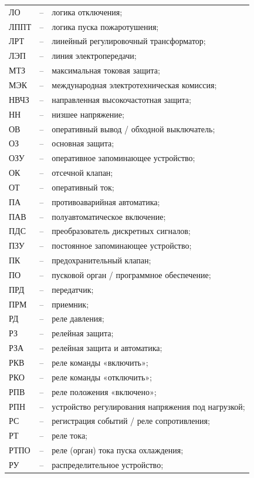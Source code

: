 \begin{longtable}{>{\raggedright\arraybackslash}m{2cm}>{\raggedright\arraybackslash}m{0.5cm}>{\raggedright\arraybackslash}m{20cm}}
ЛО & -- & логика отключения; \\
ЛППТ & -- & логика пуска пожаротушения; \\
ЛРТ & -- & линейный регулировочный трансформатор; \\
ЛЭП & -- & линия электропередачи; \\
МТЗ & -- & максимальная токовая защита; \\
МЭК & -- & международная электротехническая комиссия; \\
НВЧЗ & -- & направленная высокочастотная защита; \\
НН & -- & низшее напряжение; \\
ОВ & -- & оперативный вывод / обходной выключатель; \\
ОЗ & -- & основная защита; \\
ОЗУ & -- & оперативное запоминающее устройство; \\
ОК & -- & отсечной клапан; \\
ОТ & -- & оперативный ток; \\
ПА & -- & противоаварийная автоматика; \\
ПАВ & -- & полуавтоматическое включение; \\
ПДС & -- & преобразователь дискретных сигналов; \\
ПЗУ & -- & постоянное запоминающее устройство; \\
ПК & -- & предохранительный клапан; \\
ПО & -- & пусковой орган / программное обеспечение; \\
ПРД & -- & передатчик; \\
ПРМ & -- & приемник; \\
РД & -- & реле давления; \\
РЗ & -- & релейная защита; \\
РЗА & -- & релейная защита и автоматика; \\
РКВ & -- & реле команды «включить»; \\
РКО & -- & реле команды «отключить»; \\
РПВ & -- & реле положения «включено»; \\
РПН & -- & устройство регулирования напряжения под нагрузкой; \\
РС & -- & регистрация событий / реле сопротивления; \\
РТ & -- & реле тока; \\
РТПО & -- & реле (орган) тока пуска охлаждения; \\
РУ & -- & распределительное устройство; \\

\end{longtable}
